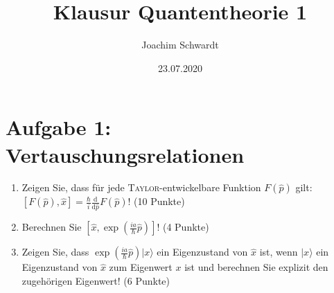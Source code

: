 \documentclass[a4paper,12pt]{article}
\newcommand{\klam}{}
\newcommand{\tecxt}{}
\newcommand{\Ket}{}
\begin{document}
\title{Klausur Quantentheorie 1}
\author{Joachim Schwardt}
\date{23.07.2020}
\maketitle

\section*{Aufgabe 1: Vertauschungsrelationen}
\begin{enumerate}
\item[a)] Zeigen Sie, dass für jede \textsc{Taylor}-entwickelbare Funktion $F(\hat{p})$ gilt: $\klam\left[ {F(\hat{p}),\hat{x}} \right]=\frac{\hbar}{i}\frac{\tecxt\text{d}}{\tecxt\text{d}\hat{p}}F(\hat{p})$! (10 Punkte)
\item[b)] Berechnen Sie $\klam\left[ {\hat{x},\exp ({\frac{ia}{\hbar}\hat{p}})} \right]$! (4 Punkte)
\item[c)] Zeigen Sie, dass $\exp ({\frac{ia}{\hbar}\hat{p}})\Ket | {x} \rangle$ ein Eigenzustand von $\hat{x}$ ist, wenn $\Ket | {x} \rangle$ ein Eigenzustand von $\hat{x}$ zum Eigenwert $x$ ist und berechnen Sie explizit den zugehörigen Eigenwert! (6 Punkte)
\end{enumerate}
\end{document}
